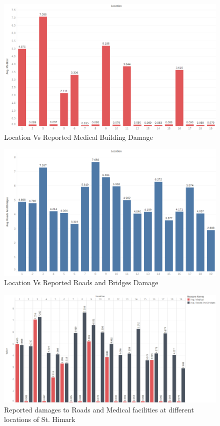 \documentclass[12pt]{extarticle}
\begin{document}
\begin{figure}[H]
\centering
	\includegraphics[width=\linewidth]{Images/medical.png}
	\caption{Location Vs Reported Medical Building Damage }
	\label{fig:medical}
\end{figure}

\begin{figure}[H]
\centering
	\includegraphics[width=\linewidth]{Images/Road.png}
	\caption{Location Vs Reported Roads and Bridges Damage }
	\label{fig:road}
\end{figure}
 
 \begin{figure}[H]
\centering
	\includegraphics[width=\linewidth]{Images/MedRoad.png}
	\caption{Reported damages to Roads and Medical facilities at different locations of St. Himark }
	\label{fig:medroad}
\end{figure}
 
\end{document}

